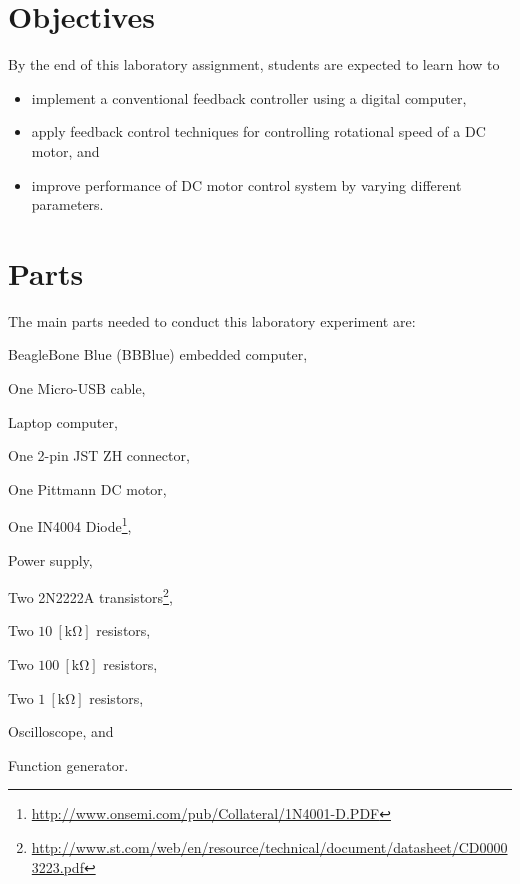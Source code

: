 
\section{Objectives}
By the end of this laboratory assignment, students are expected to learn how to 

\begin{itemize}

\item implement a conventional feedback controller  using a digital computer,
  
\item apply feedback control techniques for controlling rotational speed of a DC motor, and 
  
\item improve performance of DC motor control system by varying different parameters. 
 
  
\end{itemize}


\section{Parts}
\label{sec:partsDC_MotorControl1}
The main parts needed to conduct this laboratory experiment are: %
%
\begin{inparaenum}[a)]
\item BeagleBone Blue (BBBlue) embedded computer,
\item One Micro-USB cable, 
\item Laptop computer, 
\item One 2-pin JST ZH connector,
\item One Pittmann DC motor,
\item One IN4004 Diode\footnote{\href{http://www.onsemi.com/pub/Collateral/1N4001-D.PDF}{http://www.onsemi.com/pub/Collateral/1N4001-D.PDF}},
\item Power supply,
\item Two 2N2222A transistors\footnote{\href{http://www.st.com/web/en/resource/technical/document/datasheet/CD00003223.pdf}{http://www.st.com/web/en/resource/technical/document/datasheet/CD00003223.pdf}},
\item Two $10~[\si{\kilo\ohm}]$ resistors,
\item Two $100~[\si{\kilo\ohm}]$ resistors,
\item Two $1~[\si{\kilo\ohm}]$ resistors,
\item Oscilloscope, and 
\item Function generator.
\end{inparaenum}


